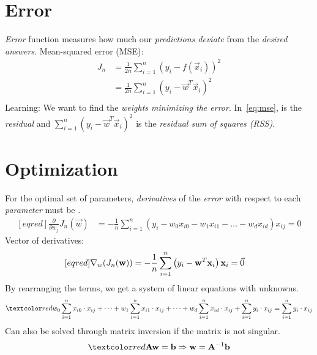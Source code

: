 \documentclass[
	exam={Midterm}
]{cs584exam}
\begin{document}
\section{Error}\label{sec:error}
\emph{Error} function measures how much our \emph{predictions deviate} from the \emph{desired answers}.
Mean-squared error (MSE):
\begin{equation}
	\begin{aligned}
		J_{n} &= \frac{1}{2n}\sum_{i=1}^{n} (y_{i} - f(\vec{x}_{i}))^{2}\\
		&= \frac{1}{2n}\sum_{i=1}^{n} (y_{i} - \vec{w}^{T}\vec{x}_{i})^{2}\\
	\end{aligned}
	\label{eq:mse}
\end{equation}
Learning: We want to find the \emph{weights minimizing the error}.
In~\eqref{eq:mse},  is the \emph{residual\label{dfn:residual}} and $\sum_{i=1}^{n} (y_{i} - \vec{w}^{T}\vec{x}_{i})^{2}$ is the \emph{residual sum of squares (RSS)}.

\section{Optimization}\label{sec:optimization}
For the optimal set of parameters, \emph{derivatives} of the \emph{error} with respect to each \emph{parameter} must be .
\begin{equation*}
\begin{aligned}[eqred]
\frac{\partial}{\partial w_{j}} J_{n}(\vec{w}) &= -\frac{1}{n} \sum_{i=1}^{n} (y_{i} - w_{0}x_{i0} - w_{1}x_{i1} - \dots - w_{d}x_{id})x_{ij} = 0
\end{aligned}
\end{equation*}
Vector of derivatives:
\begin{equation*}
\begin{aligned}[eqred]
	\nabla_{w}(J_{n}(\vec{w})) &= -\frac{1}{n} \sum_{i=1}^{n} \left( y_{i} - \vec{w}^{T}\vec{x}_{i} \right)\vec{x}_{i}= \oldvec{0}
\end{aligned}
\end{equation*}
By rearranging the terms, we get a system of linear equations with  unknowns.
\[ \data{ w_{0}\sum_{i=1}^{n} x_{i0}\cdot x_{ij} + \dots + w_{1}\sum_{i=1}^{n} x_{i1}\cdot x_{ij} + \dots + w_{d}\sum_{i=1}^{n} x_{id}\cdot x_{ij} + \sum_{i=1}^{n} y_{i}\cdot x_{ij} = \sum_{i=1}^{n} y_{i}\cdot x_{ij} } \]
Can also be solved through matrix inversion if the matrix is not singular.
\[ \data{ \vec{A}\vec{w} = \vec{b} \Rightarrow \vec{w} = \vec{A}^{-1}\vec{b} } \]
\end{document}
